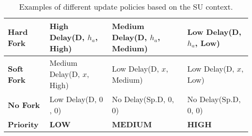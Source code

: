 
\begin{table}[h!]
\centering
\begin{tabu} to 1.0\textwidth {||X[0.6l] | X[l] | X[l] | X[l] ||}
\hline
\textbf{Hard Fork} & High Delay\newline(D, $h_a$, High) & Medium Delay\newline(D, $h_a$, Medium) & Low Delay\newline(D, $h_a$, Low) \\
\hline
\textbf{Soft Fork} & Medium Delay\newline(D, $x$, High) & Low Delay\newline(D, $x$, Medium) & Low Delay\newline(D, $x$, Low) \\
\hline
\textbf{No Fork} & Low Delay\newline(D, $0$, $0$) & No Delay\newline(Sp.D, $0$, $0$) & No Delay\newline(Sp.D, $0$, $0$) \\
\hline
\textbf{Priority} & \textbf{LOW}  & \textbf{MEDIUM} & \textbf{HIGH} \\
\hline
\end{tabu}
\caption{Examples of different update policies based on the SU context.}
\label{update-policies2-table}
\end{table}


